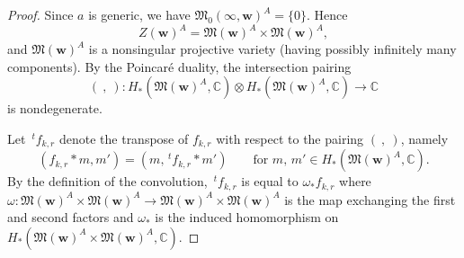 \documentclass[12pt]{amsart}
\def\Bbb{\mathbb}
\def\frak{\mathfrak}
\theoremstyle{definition}
\theoremstyle{remark}
\numberwithin{equation}{subsection}
\newcommand{\lsp}[2]{\,{}^{#1}{#2}}
\newcommand{\C}{{\Bbb C}}
\newcommand{\M}{{\frak M}} %
\newcommand{\bw}{{\mathbf w}} %
\newcommand{\Zw}{Z(\bw)}
\newcommand{\Mw}{\M(\bw)}
\begin{document}
\begin{proof}
Since $a$ is generic, we have $\M_0(\infty,\bw)^A = \{0\}$. Hence
\begin{equation*}
   \Zw^A = \Mw^A\times \Mw^A,
\end{equation*}
and $\Mw^A$ is a nonsingular projective variety
(having possibly infinitely many components). By the Poincar\'e
duality, the intersection pairing
\begin{equation*}
   (\ ,\ )\colon 
   H_*(\Mw^A,\C)\otimes H_*(\Mw^A,\C) \to \C
\end{equation*}
is nondegenerate.

Let $\lsp{t}f_{k,r}$ denote the transpose of
$f_{k,r}$ with respect to the pairing $(\ ,\ )$, namely
\begin{equation*}
   (f_{k,r}\ast m, m') = (m, \lsp{t}f_{k,r}\ast m')
   \qquad\text{for $m$, $m'\in H_*(\Mw^A,\C)$}.
\end{equation*}
By the definition of the convolution, $\lsp{t}f_{k,r}$ is equal to
$\omega_* f_{k,r}$ where
$\omega\colon \Mw^A\times\Mw^A
\to \Mw^A\times\Mw^A$ is the 
map exchanging the first and second factors
and
$\omega_*$ is the induced homomorphism on
$H_*(\Mw^A\times \Mw^A,\C)$.


\end{proof}
\end{document}
